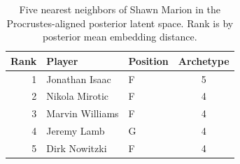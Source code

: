 \begin{table}[htbp]
  \centering\small
  \begin{tabular}{rllc}
    \toprule
    Rank & Player & Position & Archetype \\
    \midrule
    1 & Jonathan Isaac & F & 5 \\
    2 & Nikola Mirotic & F & 4 \\
    3 & Marvin Williams & F & 4 \\
    4 & Jeremy Lamb & G & 4 \\
    5 & Dirk Nowitzki & F & 4 \\
    \bottomrule
  \end{tabular}
  \caption{Five nearest neighbors of Shawn Marion in the Procrustes-aligned posterior latent space. Rank is by posterior mean embedding distance.}
  \label{tab:Shawn_Marion_neighbors}
\end{table}

